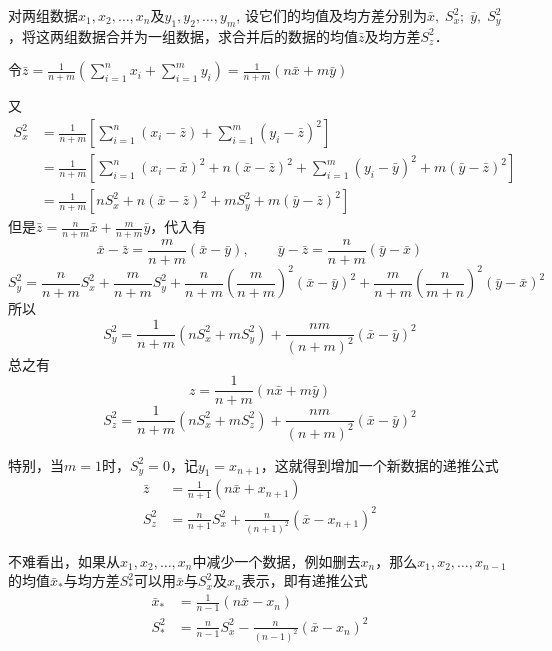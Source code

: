 \begin{example}
    对两组数据$x_1,x_2,\ldots,x_n$及$y_1,y_2,\ldots,y_m$, 设它们的均值及均方差分别为$\bar x,\; S^2_x; \; \bar y,\;  S^2_y$，将这两组数据合并为一组数据，求合并后的数据的均值$\bar z$及均方差$S^2_z$．
\end{example}

\begin{solution}
令$\bar z=\frac{1}{n+m}\left(\sum\limits^n_{i=1}x_i+\sum\limits^m_{i=1}y_i\right)=\frac{1}{n+m}(n\bar x+m\bar y)$

又
\[\begin{split}
    S^2_x&=\frac{1}{n+m}\left[\sum\limits^n_{i=1}(x_i-\bar z)+\sum\limits^m_{i=1}(y_i-\bar z)^2\right]\\
    &=\frac{1}{n+m}\left[\sum\limits^n_{i=1}(x_i-\bar x)^2 +n(\bar x-\bar z)^2+\sum\limits^m_{i=1}(y_i-\bar y)^2+m(\bar y-\bar z)^2\right]\\
    &=\frac{1}{n+m}\left[nS^2_x+n(\bar x-\bar z)^2+mS^2_y+m(\bar y-\bar z)^2\right]
\end{split}\]
但是$\bar z=\frac{n}{n+m}\bar x+\frac{m}{n+m}\bar y$，代入有
\[\bar x-\bar z=\frac{m}{n+m}(\bar x-\bar y),\qquad \bar y-\bar z=\frac{n}{n+m}(\bar y-\bar x)\]
\[S_{y}^{2}= \frac n{n+ m} S_{x}^{2}+ \frac m{n+ m} S_{y}^{2}+ \frac n{n+ m}\left(\frac m{n+ m}\right)^{2}(\bar x- \bar{y} ) ^{2}+\frac{m}{n+m}\left(\frac{n}{m+n}\right)^{2}(\bar{y}-\bar x)^{2}\]
所以
\[S_{y}^{2}=\frac{1}{n+m}\left(nS_{x}^{2}+mS_{y}^{2}\right)+\frac{nm}{(n+m)^{2}}(\bar{x}-\bar{y})^2\]
总之有
$$z=\frac{1}{n+m}(n\bar{x}+m\bar{y})$$
\[S_{z}^{2}=\frac{1}{n+m}\left(nS_{x}^{2}+mS_{z}^{2}\right)+\frac{nm}{(n+m)^{2}}(\bar{x}-\bar{y})^2\]
\end{solution}

特别，当$m=1$时，$S^2_y=0$，记$y_1=x_{n+1}$，这就得到增加一个新数据的递推公式
\[\begin{split}
    \bar z&= \frac{1}{n+1}(n\bar x+x_{n+1})\\
    S^2_z&=\frac{n}{n+1}S^2_x+\frac{n}{(n+1)^2}(\bar x-x_{n+1})^2
\end{split}\]

不难看出，如果从$x_1,x_2,\ldots,x_n$中减少一个数据，例如删去$x_n$，那么$x_1,x_2,\ldots,x_{n-1}$的均值$\bar x_{*}$与均方差$S^2_{*}$可以用$\bar x$与$S^2_x$及$x_n$表示，即有递推公式
\[\begin{split}
    \bar x_{*}&= \frac{1}{n-1}(n\bar x-x_{n})\\
    S^2_{*}&=\frac{n}{n-1}S^2_x-\frac{n}{(n-1)^2}(\bar x-x_{n})^2
\end{split}\]

